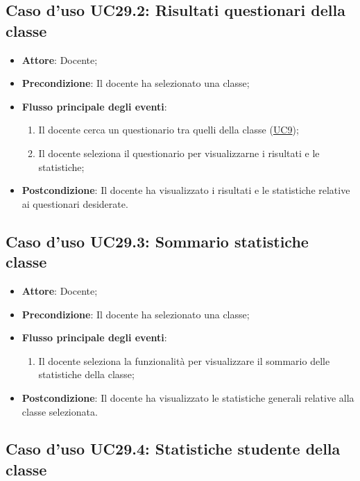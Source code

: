 \documentclass[12pt,a4paper]{article}
\begin{document}
\subsection{Caso d'uso UC29.2: Risultati questionari della classe}

\begin{itemize}

\item \textbf{Attore}: Docente; 
\item \textbf{Precondizione}: Il docente ha selezionato una classe;

\item \textbf{Flusso principale degli eventi}:
\begin{enumerate}
	\item Il docente cerca un questionario tra quelli della classe (\hyperlink{UC9}{UC9});
	\item Il docente seleziona il questionario per visualizzarne i risultati e le statistiche;
	
\end{enumerate}
\item \textbf{Postcondizione}: Il docente ha visualizzato i risultati e le statistiche relative ai questionari desiderate.
\end{itemize}
\hypertarget{UC29.3}{}
\subsection{Caso d'uso UC29.3: Sommario statistiche classe}

\begin{itemize}

\item \textbf{Attore}: Docente; 
\item \textbf{Precondizione}: Il docente ha selezionato una classe;

\item \textbf{Flusso principale degli eventi}:
\begin{enumerate}
	\item Il docente seleziona la funzionalità per visualizzare il sommario delle statistiche della classe;
	
\end{enumerate}
\item \textbf{Postcondizione}: Il docente ha visualizzato le statistiche generali relative alla classe selezionata.
\end{itemize}
\hypertarget{UC29.4}{}
\subsection{Caso d'uso UC29.4: Statistiche studente della classe}
\end{document}
